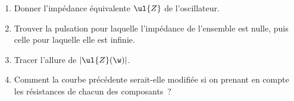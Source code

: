 \documentclass[a4paper, 12pt, final, garamond]{book}
\begin{document}
\begin{enumerate}
    \item Donner l'impédance équivalente $\ul{Z}$ de l'oscillateur.
    \item Trouver la pulsation pour laquelle l'impédance de l'ensemble est
        nulle, puis celle pour laquelle elle est infinie.
    \item Tracer l'allure de $|\ul{Z}(\w)|$.
    \item Comment la courbe précédente serait-elle modifiée si on prenant en
        compte les résistances de chacun des composants~?
\end{enumerate}
\end{document}
